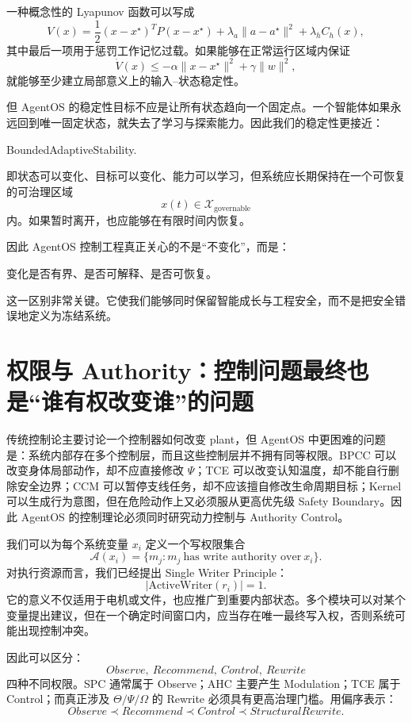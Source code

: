 一种概念性的 Lyapunov 函数可以写成
\[
V(x)
=
\frac{1}{2}
(x-x^\star)^T
P
(x-x^\star)
+
\lambda_a
\|a-a^\star\|^2
+
\lambda_h
C_h(x),
\]
其中最后一项用于惩罚工作记忆过载。如果能够在正常运行区域内保证
\[
\dot V(x)\leq -\alpha\|x-x^\star\|^2+\gamma\|w\|^2,
\]
就能够至少建立局部意义上的输入--状态稳定性。

但 AgentOS 的稳定性目标不应是让所有状态趋向一个固定点。一个智能体如果永远回到唯一固定状态，就失去了学习与探索能力。因此我们的稳定性更接近：
\begin{statementbox}
BoundedAdaptiveStability.
\end{statementbox}
即状态可以变化、目标可以变化、能力可以学习，但系统应长期保持在一个可恢复的可治理区域
\[
x(t)\in\mathcal X_{\mathrm{governable}}
\]
内。如果暂时离开，也应能够在有限时间内恢复。

因此 AgentOS 控制工程真正关心的不是``不变化''，而是：
\begin{statementbox}
变化是否有界、是否可解释、是否可恢复。
\end{statementbox}
这一区别非常关键。它使我们能够同时保留智能成长与工程安全，而不是把安全错误地定义为冻结系统。

\section{权限与 Authority：控制问题最终也是“谁有权改变谁”的问题}

传统控制论主要讨论一个控制器如何改变 plant，但 AgentOS 中更困难的问题是：系统内部存在多个控制层，而且这些控制层并不拥有同等权限。BPCC 可以改变身体局部动作，却不应直接修改 $\Psi$；TCE 可以改变认知温度，却不能自行删除安全边界；CCM 可以暂停支线任务，却不应该擅自修改生命周期目标；Kernel 可以生成行为意图，但在危险动作上又必须服从更高优先级 Safety Boundary。因此 AgentOS 的控制理论必须同时研究动力控制与 Authority Control。

我们可以为每个系统变量 $x_i$ 定义一个写权限集合
\[
\mathcal A(x_i)
=
\{
m_j:
m_j\ \text{has write authority over}\ x_i
\}.
\]
对执行资源而言，我们已经提出 Single Writer Principle：
\[
\boxed{
|\mathrm{ActiveWriter}(r_i)|=1.
}
\]
它的意义不仅适用于电机或文件，也应推广到重要内部状态。多个模块可以对某个变量提出建议，但在一个确定时间窗口内，应当存在唯一最终写入权，否则系统可能出现控制冲突。

因此可以区分：
\[
\boxed{
Observe
,\ Recommend
,\ Control
,\ Rewrite
}
\]
四种不同权限。SPC 通常属于 Observe；AHC 主要产生 Modulation；TCE 属于 Control；而真正涉及 $\Theta/\Psi/\Omega$ 的 Rewrite 必须具有更高治理门槛。用偏序表示：
\[
Observe
\prec
Recommend
\prec
Control
\prec
StructuralRewrite.
\]

